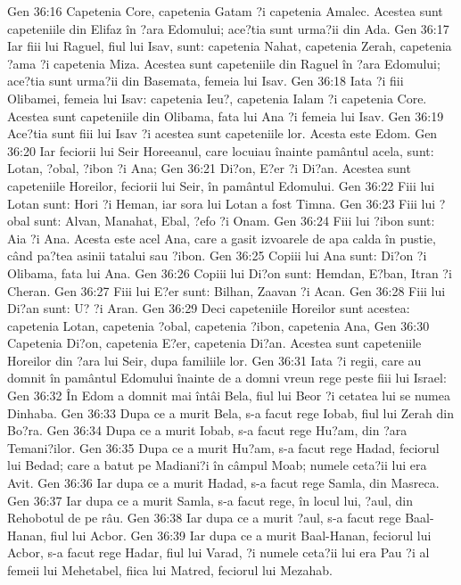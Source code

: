 Gen 36:16  Capetenia Core, capetenia Gatam ?i capetenia Amalec. Acestea sunt capeteniile din Elifaz în ?ara Edomului; ace?tia sunt urma?ii din Ada.
Gen 36:17  Iar fiii lui Raguel, fiul lui Isav, sunt: capetenia Nahat, capetenia Zerah, capetenia ?ama ?i capetenia Miza. Acestea sunt capeteniile din Raguel în ?ara Edomului; ace?tia sunt urma?ii din Basemata, femeia lui Isav.
Gen 36:18  Iata ?i fiii Olibamei, femeia lui Isav: capetenia Ieu?, capetenia Ialam ?i capetenia Core. Acestea sunt capeteniile din Olibama, fata lui Ana ?i femeia lui Isav.
Gen 36:19  Ace?tia sunt fiii lui Isav ?i acestea sunt capeteniile lor. Acesta este Edom.
Gen 36:20  Iar feciorii lui Seir Horeeanul, care locuiau înainte pamântul acela, sunt: Lotan, ?obal, ?ibon ?i Ana;
Gen 36:21  Di?on, E?er ?i Di?an. Acestea sunt capeteniile Horeilor, feciorii lui Seir, în pamântul Edomului.
Gen 36:22  Fiii lui Lotan sunt: Hori ?i Heman, iar sora lui Lotan a fost Timna.
Gen 36:23  Fiii lui ?obal sunt: Alvan, Manahat, Ebal, ?efo ?i Onam.
Gen 36:24  Fiii lui ?ibon sunt: Aia ?i Ana. Acesta este acel Ana, care a gasit izvoarele de apa calda în pustie, când pa?tea asinii tatalui sau ?ibon.
Gen 36:25  Copiii lui Ana sunt: Di?on ?i Olibama, fata lui Ana.
Gen 36:26  Copiii lui Di?on sunt: Hemdan, E?ban, Itran ?i Cheran.
Gen 36:27  Fiii lui E?er sunt: Bilhan, Zaavan ?i Acan.
Gen 36:28  Fiii lui Di?an sunt: U? ?i Aran.
Gen 36:29  Deci capeteniile Horeilor sunt acestea: capetenia Lotan, capetenia ?obal, capetenia ?ibon, capetenia Ana,
Gen 36:30  Capetenia Di?on, capetenia E?er, capetenia Di?an. Acestea sunt capeteniile Horeilor din ?ara lui Seir, dupa familiile lor.
Gen 36:31  Iata ?i regii, care au domnit în pamântul Edomului înainte de a domni vreun rege peste fiii lui Israel:
Gen 36:32  În Edom a domnit mai întâi Bela, fiul lui Beor ?i cetatea lui se numea Dinhaba.
Gen 36:33  Dupa ce a murit Bela, s-a facut rege Iobab, fiul lui Zerah din Bo?ra.
Gen 36:34  Dupa ce a murit Iobab, s-a facut rege Hu?am, din ?ara Temani?ilor.
Gen 36:35  Dupa ce a murit Hu?am, s-a facut rege Hadad, feciorul lui Bedad; care a batut pe Madiani?i în câmpul Moab; numele ceta?ii lui era Avit.
Gen 36:36  Iar dupa ce a murit Hadad, s-a facut rege Samla, din Masreca.
Gen 36:37  Iar dupa ce a murit Samla, s-a facut rege, în locul lui, ?aul, din Rehobotul de pe râu.
Gen 36:38  Iar dupa ce a murit ?aul, s-a facut rege Baal-Hanan, fiul lui Acbor.
Gen 36:39  Iar dupa ce a murit Baal-Hanan, feciorul lui Acbor, s-a facut rege Hadar, fiul lui Varad, ?i numele ceta?ii lui era Pau ?i al femeii lui Mehetabel, fiica lui Matred, feciorul lui Mezahab.
